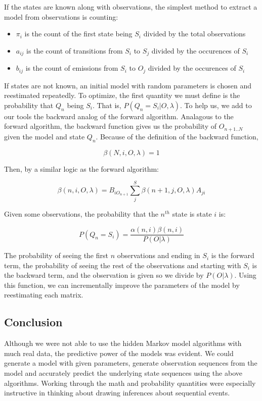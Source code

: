 \documentclass[11pt,a4paper]{article}
\begin{document}
If the states are known along with observations, the simplest method to extract a model from observations is counting:
\begin{itemize}
\item $\pi_i$ is the count of the first state being $S_i$ divided by the total observations
\item $a_{ij}$ is the count of transitions from $S_i$ to $S_j$ divided by the occurences of $S_i$
\item $b_{ij}$ is the count of emissions from $S_i$ to $O_j$ divided by the occurences of $S_i$
\end{itemize}

If states are not known, an initial model with random parameters is chosen and reestimated repeatedly. To optimize, the first quantity we must define is the probability that $Q_n$ being $S_i$. That is, $P(Q_n = S_i | O, \lambda)$. To help us, we add to our tools the backward analog of the forward algorithm. Analagous to the forward algorithm, the backward function gives us the probability of $O_{n+1..N}$ given the model and state $Q_n$. Because of the definition of the backward function,

\[
\beta(N, i, O, \lambda) = 1
\]

Then, by a similar logic as the forward algorithm:

\[
\beta(n, i, O, \lambda) = B_{iO_{n+1}} \sum_j^S{\beta(n+1, j, O, \lambda)A_{ji}}
\]

Given some observations, the probability that the $n^{th}$ state is state $i$ is:

\[
P(Q_n = S_i) = \frac{\alpha(n, i) \beta(n, i)}{P(O|\lambda)}
\]

The probability of seeing the first $n$ observations and ending in $S_i$ is the forward term, the probability of seeing the rest of the observations and starting with $S_i$ is the backward term, and the observation is given so we divide by $P(O|\lambda)$. Using this function, we can incrementally improve the parameters of the model by reestimating each matrix.

\subsection{Conclusion}
\label{Hidden Markov Models:Conclusion}

Although we were not able to use the hidden Markov model algorithms with much real data, the predictive power of the models was evident. We could generate a model with given parameters, generate observation sequences from the model and accurately predict the underlying state sequences using the above algorithms. Working through the math and probability quantities were especially instructive in thinking about drawing inferences about sequential events.
\end{document}
